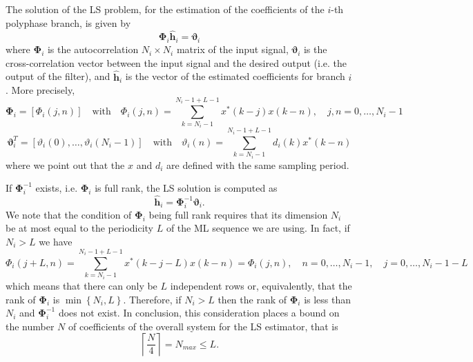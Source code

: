 \documentclass[10pt]{article}
\begin{document}
The solution of the LS problem, for the estimation of the coefficients of the $i$-th polyphase branch, is given by
\begin{equation}
	\mathbf{\Phi}_i \mathbf{\hat{h}}_i = \boldsymbol\vartheta_i
\end{equation}
where $\mathbf{\Phi}_i$ is the autocorrelation $N_i \times N_i$ matrix of the input signal, $ \boldsymbol\vartheta_i$ is the cross-correlation vector between the input signal and the desired output (i.e. the output of the filter), and $\mathbf{\hat{h}}_i$ is the vector of the estimated coefficients for branch $i$. More precisely,
\begin{equation}
	\mathbf{\Phi}_i = [\Phi_i(j,n)] \quad \mathrm{ with } \quad \Phi_i(j,n) = \sum_{k=N_i-1}^{N_i-1+L-1} x^*(k-j)x(k-n), \quad j,n=0,\ldots,N_i-1
\end{equation}
\begin{equation}
	\boldsymbol\vartheta_i ^T = [\vartheta_i(0),\ldots, \vartheta_i(N_i-1)] \quad \mathrm{ with } \quad \vartheta_i(n) = \sum_{k=N_i-1}^{N_i-1+L-1} d_i(k)x^*(k-n)
\end{equation}
where we point out that the $x$ and $d_i$ are defined with the same sampling period.

If $\mathbf{\Phi}_i^{-1}$ exists, i.e. $\mathbf{\Phi}_i$ is full rank, the LS solution is computed as
\begin{equation}
	\mathbf{\hat{h}}_i = \mathbf{\Phi}_i^{-1} \boldsymbol\vartheta_i.
\end{equation}
We note that the condition of $\mathbf{\Phi}_i$ being full rank requires that its dimension $N_i$ be at most equal to the periodicity $L$ of the ML sequence we are using. In fact, if $N_i > L$ we have
\begin{equation}
	\Phi_i(j+L, n) = \sum_{k=N_i-1}^{N_i-1+L-1} x^*(k-j-L)x(k-n) = \Phi_i(j, n), \quad n=0,\ldots,N_i-1, \quad j = 0,\ldots,N_i-1-L
\end{equation}
which means that there can only be $L$ independent rows or, equivalently, that the rank of $\mathbf{\Phi}_i$ is $\min \left\lbrace N_i, L \right\rbrace$. Therefore, if $N_i > L$ then the rank of $\mathbf{\Phi}_i$ is less than $N_i$ and $\mathbf{\Phi}_i^{-1}$ does not exist. In conclusion, this consideration places a bound on the number $N$ of coefficients of the overall system for the LS estimator, that is
\begin{equation}
	\left\lceil\frac{N}{4}\right\rceil = N_{max} \leq L.
\end{equation}
\end{document}
